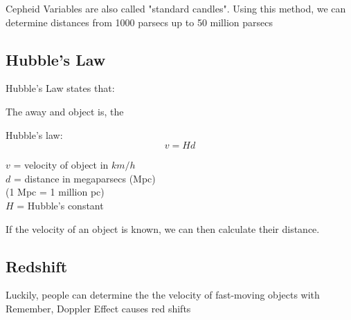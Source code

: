 Cepheid Variables are also called "standard candles". Using this method, we can determine distances from 1000 parsecs up to 50 million parsecs

\subsection{Hubble's Law}
Hubble's Law states that:
\begin{center}
    The  away and object is, the 
\end{center}

Hubble's law:
\[
    v = Hd
\]
\begin{center}
    $v$ = velocity of object in $km/h$\\
    $d$ = distance in megaparsecs (Mpc)\\
    (1 Mpc = 1 million pc)\\
    $H$ = Hubble's constant
\end{center}

If the velocity of an object is known, we can then calculate their distance.

\subsection{Redshift} 
Luckily, people can determine the the velocity of fast-moving objects with \\
Remember, Doppler Effect causes red shifts